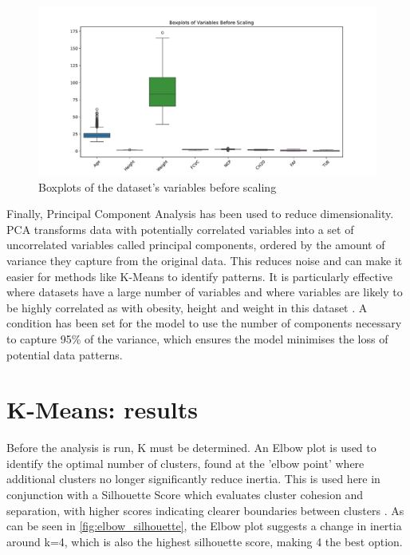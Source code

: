 \begin{figure}[h]
\centering
\includegraphics[width=\textwidth]{boxplots_prescale.pdf}
\caption{Boxplots of the dataset's variables before scaling}
\label{fig:boxplots_prescale}
\end{figure}

Finally, Principal Component Analysis has been used to reduce dimensionality. PCA transforms data with potentially correlated variables into a set of uncorrelated variables called principal components, ordered by the amount of variance they capture from the original data. This reduces noise and can make it easier for methods like K-Means to identify patterns. It is particularly effective where datasets have a large number of variables and where variables are likely to be highly correlated as with obesity, height and weight in this dataset \cite{Bandyopadhyay2013}. A condition has been set for the model to use the number of components necessary to capture 95\% of the variance, which ensures the model minimises the loss of potential data patterns.

\section{K-Means: results}

Before the analysis is run, K must be determined. An Elbow plot is used to identify the optimal number of clusters, found at the 'elbow point' where additional clusters no longer significantly reduce inertia. This is used here in conjunction with a Silhouette Score which evaluates cluster cohesion and separation, with higher scores indicating clearer boundaries between clusters \cite{Geron2022}. As can be seen in \ref{fig:elbow_silhouette}, the Elbow plot suggests a change in inertia around k=4, which is also the highest silhouette score, making 4 the best option. 

